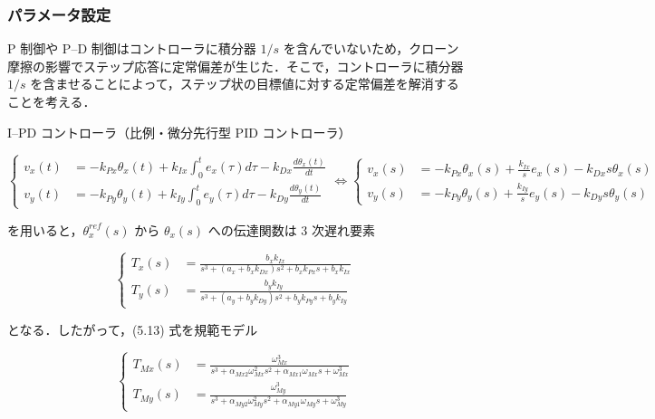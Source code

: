 \subsubsection{パラメータ設定}

P 制御や P--D 制御はコントローラに積分器 \(1/s\) を含んでいないため，クローン摩擦の影響でステップ応答に定常偏差が生じた．そこで，コントローラに積分器 \(1/s\) を含ませることによって，ステップ状の目標値に対する定常偏差を解消することを考える．

I--PD コントローラ（比例・微分先行型 PID コントローラ）

\begin{equation}
\left\{
\begin{aligned}
v_x(t) &= -k_{Px} \theta_x(t) + k_{Ix} \int_0^t e_x(\tau) d\tau - k_{Dx} \frac{d\theta_x(t)}{dt} \\
v_y(t) &= -k_{Py} \theta_y(t) + k_{Iy} \int_0^t e_y(\tau) d\tau - k_{Dy} \frac{d\theta_y(t)}{dt}
\end{aligned}
\right.
\Longleftrightarrow
\left\{
\begin{aligned}
v_x(s) &= -k_{Px} \theta_x(s) + \frac{k_{Ix}}{s} e_x(s) - k_{Dx}s \theta_x(s) \\
v_y(s) &= -k_{Py} \theta_y(s) + \frac{k_{Iy}}{s} e_y(s) - k_{Dy}s \theta_y(s)
\end{aligned}
\right.
\tag{5.12}
\end{equation}

を用いると，\( \theta_x^{ref}(s) \) から \( \theta_x(s) \) への伝達関数は 3 次遅れ要素

\begin{equation}
\left\{
\begin{aligned}
T_x(s) &= \frac{b_x k_{Ix}}{s^3 + (a_x + b_x k_{Dx})s^2 + b_x k_{Px}s + b_x k_{Ix}} \\
T_y(s) &= \frac{b_y k_{Iy}}{s^3 + (a_y + b_y k_{Dy})s^2 + b_y k_{Py}s + b_y k_{Iy}}
\end{aligned}
\right.
\tag{5.13}
\end{equation}

となる．したがって，(5.13) 式を規範モデル

\begin{equation}
\left\{
\begin{aligned}
T_{Mx}(s) &= \frac{\omega_{Mx}^3}{s^3 + \alpha_{Mx2} \omega_{Mx}^2 s^2 + \alpha_{Mx1} \omega_{Mx}s + \omega_{Mx}^3} \\
T_{My}(s) &= \frac{\omega_{My}^3}{s^3 + \alpha_{My2} \omega_{My}^2 s^2 + \alpha_{My1} \omega_{My}s + \omega_{My}^3}
\end{aligned}
\right.
\tag{5.14}
\end{equation}

